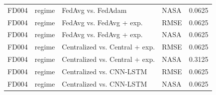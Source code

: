 \begin{tabular}{llllr}
FD004 & regime & FedAvg vs. FedAdam & NASA & 0.0625 \\
FD004 & regime & FedAvg vs. FedAvg + exp. & RMSE & 0.0625 \\
FD004 & regime & FedAvg vs. FedAvg + exp. & NASA & 0.0625 \\
FD004 & regime & Centralized vs. Central + exp. & RMSE & 0.0625 \\
FD004 & regime & Centralized vs. Central + exp. & NASA & 0.3125 \\
FD004 & regime & Centralized vs. CNN-LSTM & RMSE & 0.0625 \\
FD004 & regime & Centralized vs. CNN-LSTM & NASA & 0.0625 \\
\bottomrule
\end{tabular}
